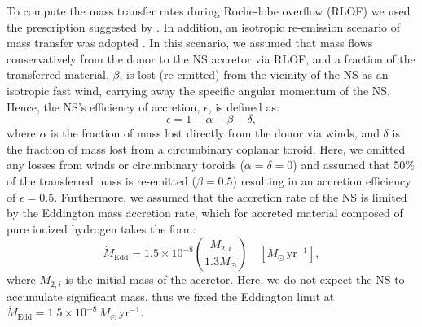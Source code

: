 \documentclass[main.tex]{subfiles}
\begin{document}
        To compute the mass transfer rates during Roche-lobe overflow (RLOF) we used the prescription suggested by \cite{Kolb:aap1990}. In addition, an isotropic re-emission scenario of mass transfer was adopted \citep[see][for a review]{Tauris:bk2006}. In this scenario, we assumed that mass flows conservatively from the donor to the NS accretor via RLOF, and a fraction of the transferred material, $\beta$, is lost (re-emitted) from the vicinity of the NS as an isotropic fast wind, carrying away the specific angular momentum of the NS. Hence, the NS's efficiency of accretion, $\epsilon$, is defined as:
        \begin{equation}
            \label{eq:accretion_efficiency}
            \epsilon = 1 - \alpha - \beta - \delta,
        \end{equation}
        where $\alpha$ is the fraction of mass lost directly from the donor via winds, and $\delta$ is the fraction of mass lost from a circumbinary coplanar toroid. Here, we omitted any losses from winds or circumbinary toroids ($\alpha = \delta = 0$) and assumed that 50\% of the transferred mass is re-emitted ($\beta = 0.5$) resulting in an accretion efficiency of $\epsilon = 0.5$.
        Furthermore, we assumed that the accretion rate of the NS is limited by the Eddington mass accretion rate, which for accreted material composed of pure ionized hydrogen takes the form:
        \begin{equation}
            \label{eq:edd_limit}
            \dot{M}_{\text{Edd}} = 1.5 \times 10^{-8} \left(\frac{M_{2,i}}{1.3 M_\odot}\right)\quad[M_\odot\,\text{yr}^{-1}],
        \end{equation}
        where $M_{2,i}$ is the initial mass of the accretor. Here, we do not expect the NS to accumulate significant mass, thus we fixed the Eddington limit at $\dot{M}_{\text{Edd}} = 1.5 \times 10^{-8}\,M_\odot\,\text{yr}^{-1}$.
        
\end{document}
